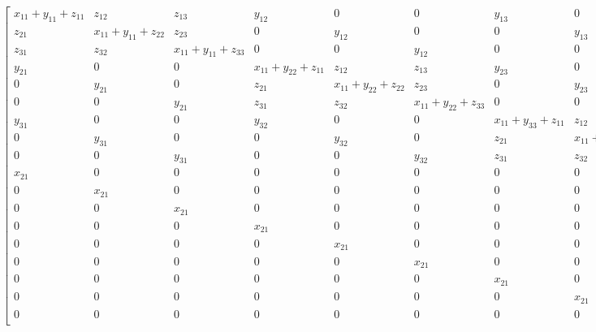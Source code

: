 \newpage
\begin{equation*}
\left[\begin{array}{cccccccccccccccccc}x_{11} + y_{11} + z_{11} & z_{12} & z_{13} & y_{12} & 0 & 0 & y_{13} & 0 & 0 & x_{12} & 0 & 0 & 0 & 0 & 0 & 0 & 0 & 0\\z_{21} & x_{11} + y_{11} + z_{22} & z_{23} & 0 & y_{12} & 0 & 0 & y_{13} & 0 & 0 & x_{12} & 0 & 0 & 0 & 0 & 0 & 0 & 0\\z_{31} & z_{32} & x_{11} + y_{11} + z_{33} & 0 & 0 & y_{12} & 0 & 0 & y_{13} & 0 & 0 & x_{12} & 0 & 0 & 0 & 0 & 0 & 0\\y_{21} & 0 & 0 & x_{11} + y_{22} + z_{11} & z_{12} & z_{13} & y_{23} & 0 & 0 & 0 & 0 & 0 & x_{12} & 0 & 0 & 0 & 0 & 0\\0 & y_{21} & 0 & z_{21} & x_{11} + y_{22} + z_{22} & z_{23} & 0 & y_{23} & 0 & 0 & 0 & 0 & 0 & x_{12} & 0 & 0 & 0 & 0\\0 & 0 & y_{21} & z_{31} & z_{32} & x_{11} + y_{22} + z_{33} & 0 & 0 & y_{23} & 0 & 0 & 0 & 0 & 0 & x_{12} & 0 & 0 & 0\\y_{31} & 0 & 0 & y_{32} & 0 & 0 & x_{11} + y_{33} + z_{11} & z_{12} & z_{13} & 0 & 0 & 0 & 0 & 0 & 0 & x_{12} & 0 & 0\\0 & y_{31} & 0 & 0 & y_{32} & 0 & z_{21} & x_{11} + y_{33} + z_{22} & z_{23} & 0 & 0 & 0 & 0 & 0 & 0 & 0 & x_{12} & 0\\0 & 0 & y_{31} & 0 & 0 & y_{32} & z_{31} & z_{32} & x_{11} + y_{33} + z_{33} & 0 & 0 & 0 & 0 & 0 & 0 & 0 & 0 & x_{12}\\x_{21} & 0 & 0 & 0 & 0 & 0 & 0 & 0 & 0 & x_{22} + y_{11} + z_{11} & z_{12} & z_{13} & y_{12} & 0 & 0 & y_{13} & 0 & 0\\0 & x_{21} & 0 & 0 & 0 & 0 & 0 & 0 & 0 & z_{21} & x_{22} + y_{11} + z_{22} & z_{23} & 0 & y_{12} & 0 & 0 & y_{13} & 0\\0 & 0 & x_{21} & 0 & 0 & 0 & 0 & 0 & 0 & z_{31} & z_{32} & x_{22} + y_{11} + z_{33} & 0 & 0 & y_{12} & 0 & 0 & y_{13}\\0 & 0 & 0 & x_{21} & 0 & 0 & 0 & 0 & 0 & y_{21} & 0 & 0 & x_{22} + y_{22} + z_{11} & z_{12} & z_{13} & y_{23} & 0 & 0\\0 & 0 & 0 & 0 & x_{21} & 0 & 0 & 0 & 0 & 0 & y_{21} & 0 & z_{21} & x_{22} + y_{22} + z_{22} & z_{23} & 0 & y_{23} & 0\\0 & 0 & 0 & 0 & 0 & x_{21} & 0 & 0 & 0 & 0 & 0 & y_{21} & z_{31} & z_{32} & x_{22} + y_{22} + z_{33} & 0 & 0 & y_{23}\\0 & 0 & 0 & 0 & 0 & 0 & x_{21} & 0 & 0 & y_{31} & 0 & 0 & y_{32} & 0 & 0 & x_{22} + y_{33} + z_{11} & z_{12} & z_{13}\\0 & 0 & 0 & 0 & 0 & 0 & 0 & x_{21} & 0 & 0 & y_{31} & 0 & 0 & y_{32} & 0 & z_{21} & x_{22} + y_{33} + z_{22} & z_{23}\\0 & 0 & 0 & 0 & 0 & 0 & 0 & 0 & x_{21} & 0 & 0 & y_{31} & 0 & 0 & y_{32} & z_{31} & z_{32} & x_{22} + y_{33} + z_{33}\end{array}\right]
\end{equation*}
